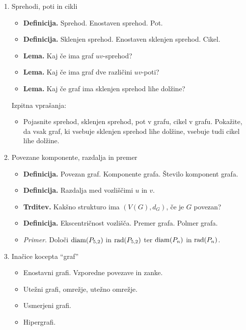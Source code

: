 \begin{enumerate}
    \item Sprehodi, poti in cikli
    \begin{itemize}
        \item \colorbox{purple!30}{\textbf{Definicija.}} Sprehod. Enostaven sprehod. Pot.
        \item \colorbox{purple!30}{\textbf{Definicija.}} Sklenjen sprehod. Enostaven sklenjen sprehod. Cikel.
        \item \colorbox{blue!30}{\textbf{Lema.}} Kaj če ima graf \(uv\)-sprehod?
        \item \colorbox{blue!30}{\textbf{Lema.}} Kaj če ima graf dve različini \(uv\)-poti?
        \item \colorbox{blue!30}{\textbf{Lema.}} Kaj če graf ima sklenjen sprehod lihe dolžine?
    \end{itemize}
    Izpitna vprašanja:
    \begin{itemize}
        \item  Pojasnite sprehod, sklenjen sprehod, pot v grafu, cikel v grafu. Pokažite, da vsak graf, ki vsebuje sklenjen sprehod lihe dolžine, vsebuje tudi cikel lihe dolžine.
    \end{itemize}  
    
    \item Povezane komponente, razdalja in premer
    \begin{itemize}
        \item \colorbox{purple!30}{\textbf{Definicija.}} Povezan graf. Komponente grafa. Število komponent grafa.
        \item \colorbox{purple!30}{\textbf{Definicija.}} Razdalja med vozliščimi \(u\) in \(v\).
        \item \colorbox{blue!30}{\textbf{Trditev.}} Kakšno strukturo ima \((V(G), d_G)\), če je \(G\) povezan?
        \item \colorbox{purple!30}{\textbf{Definicija.}} Ekscentričnost vozlišča. Premer grafa. Polmer grafa.
        \item \colorbox{yellow!30}{\emph{Primer.}} Določi \(\operatorname{diam}(P_{5,2})\) in \(\operatorname{rad}(P_{5,2})\) ter \(\operatorname{diam}(P_n)\) in \(\operatorname{rad}(P_n)\).
    \end{itemize}

    \item Inačice kocepta "`graf"'
    \begin{itemize}
        \item Enostavni grafi. Vzporedne povezave in zanke.
        \item Utežni grafi, omrežje, utežno omrežje.
        \item Usmerjeni grafi.
        \item Hipergrafi.
    \end{itemize}


\end{enumerate}
